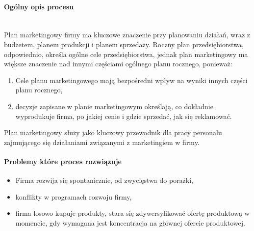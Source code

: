 \documentclass[a4paper, 12pt]{article}
\begin{document}
\paragraph{Ogólny opis procesu}\mbox{}\\
\hspace*{1 cm}Plan marketingowy firmy ma kluczowe znaczenie przy planowaniu działań, wraz z budżetem, planem produkcji i planem sprzedaży. Roczny plan przedsiębiorstwa, odpowiednio, określa ogólne cele przedsiębiorstwa, jednak plan marketingowy ma większe znaczenie nad innymi częściami ogólnego planu rocznego, ponieważ:
\begin{enumerate}
	\item Cele planu marketingowego mają bezpośredni wpływ na wyniki innych części planu rocznego,
	\item decyzje zapisane w planie marketingowym określają, co dokładnie wyprodukuje firma, po jakiej cenie i gdzie sprzedać, jak się reklamować.
\end{enumerate}
\hspace*{1 cm}Plan marketingowy służy jako kluczowy przewodnik dla pracy personalu zajmującego się działaniami związanymi z marketingiem w firmy.
\paragraph{Problemy które proces rozwiązuje}
\begin{itemize}
	\item Firma rozwija się spontanicznie, od zwycięstwa do porażki,
	\item konflikty w programach rozwoju firmy,
	\item firma losowo kupuje produkty, stara się zdywersyfikować ofertę produktową w momencie, gdy wymagana jest koncentracja na głównej ofercie produktowej.
\end{itemize} 
\end{document}
